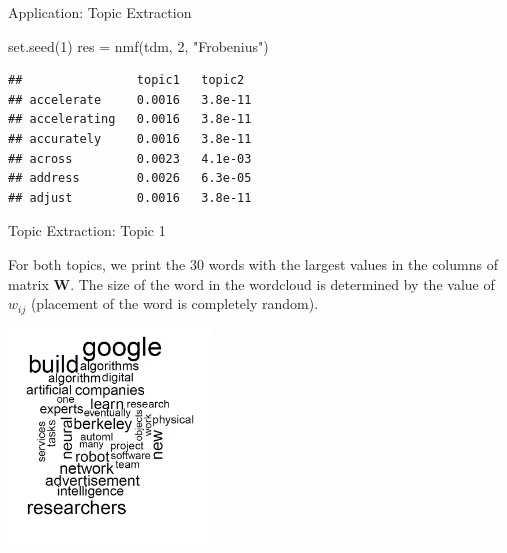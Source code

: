 \begin{vbframe}{Application: Topic Extraction}
\footnotesize
\begin{verbbox}
set.seed(1)
res = nmf(tdm, 2, "Frobenius")
\end{verbbox}
\col

\lz
\begin{verbatim}
##                topic1   topic2
## accelerate     0.0016   3.8e-11
## accelerating   0.0016   3.8e-11
## accurately     0.0016   3.8e-11
## across         0.0023   4.1e-03
## address        0.0026   6.3e-05
## adjust         0.0016   3.8e-11
\end{verbatim}





\normalsize
\end{vbframe}

\begin{vbframe}{Topic Extraction: Topic 1}

For both topics, we print the $30$ words with the largest values in the columns of matrix $\mathbf{W}$. The size of the word in the wordcloud is determined by the value of $w_{ij}$ (placement of the word is completely random).\\

\begin{center}
	\includegraphics[width = 0.4\textwidth]{figure_man/wordcloud01.png}
\end{center}



\end{vbframe}

